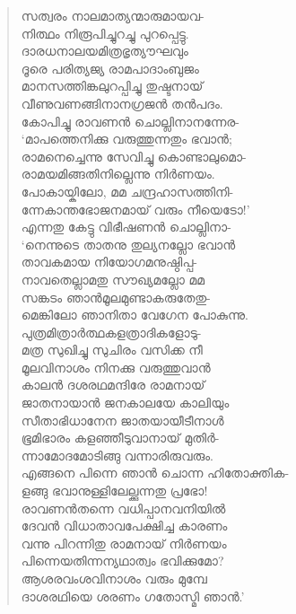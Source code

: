 \begin{verse}
സത്വരം നാലമാത്യന്മാരുമായവ-\\
നിത്ഥം നിരൂപിച്ചുറച്ചു പുറപ്പെട്ടു.\\
ദാരധനാലയമിത്രഭൃത്യൗഘവും\\
ദൂരെ പരിത്യജ്യ രാമപാദാംബുജം\\
മാനസത്തിങ്കലുറപ്പിച്ചു തുഷ്ടനായ്\\
വീണുവണങ്ങിനാനഗ്രജന്‍ തന്‍പദം.\\
കോപിച്ചു രാവണന്‍ ചൊല്ലിനാനന്നേര-\\
‘മാപത്തെനിക്കു വരുത്തുന്നതും ഭവാന്‍;\\
രാമനെച്ചെന്നു സേവിച്ചു കൊണ്ടാലുമൊ-\\
രാമയമിങ്ങതിനില്ലെന്നു നിര്‍ണയം.\\
പോകായ്കിലോ, മമ ചന്ദ്രഹാസത്തിനി-\\
ന്നേകാന്തഭോജനമായ് വരും നീയെടോ!’\\
എന്നതു കേട്ടു വിഭീഷണന്‍ ചൊല്ലിനാ-\\
‘നെന്നുടെ താതനു തുല്യനല്ലോ ഭവാന്‍\\
താവകമായ നിയോഗമനുഷ്ഠിപ്പ-\\
നാവതെല്ലാമതു സൗഖ്യമല്ലോ മമ\\
സങ്കടം ഞാന്‍മൂലമുണ്ടാകരുതേതു-\\
മെങ്കിലോ ഞാനിതാ വേഗേന പോകുന്നു.\\
പുത്രമിത്രാര്‍ത്ഥകളത്രാദികളോടു-\\
മത്ര സുഖിച്ചു സുചിരം വസിക്ക നീ\\
മൂലവിനാശം നിനക്കു വരുത്തുവാന്‍\\
കാലന്‍ ദശരഥമന്ദിരേ രാമനായ്\\
ജാതനായാന്‍ ജനകാലയേ കാലിയും\\
സീതാഭിധാനേന ജാതയായീടീനാള്‍\\
ഭൂമിഭാരം കളഞ്ഞീടുവാനായ് മുതിര്‍-\\
ന്നാമോദമോടിങ്ങു വന്നാരിരുവരും.\\
എങ്ങനെ പിന്നെ ഞാന്‍ ചൊന്ന ഹിതോക്തിക-\\
ളങ്ങു ഭവാനുള്ളിലേല്ക്കുന്നതു പ്രഭോ!\\
രാവണന്‍തന്നെ വധിപ്പാനവനിയില്‍\\
ദേവന്‍ വിധാതാവപേക്ഷിച്ച കാരണം\\
വന്നു പിറന്നിതു രാമനായ് നിര്‍ണയം\\
പിന്നെയതിന്നന്യഥാത്വം ഭവിക്കുമോ?\\
ആശരവംശവിനാശം വരും മുമ്പേ\\
ദാശരഥിയെ ശരണം ഗതോസ്മി ഞാന്‍.’
\end{verse}


